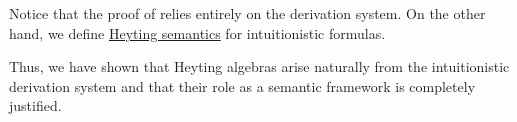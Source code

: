 \begin{remark}\label{rem:thm:intuitionistic_lindenbaum_tarski_algebra/syntactic_proof}
  Notice that the proof of  relies entirely on the derivation system. On the other hand, we define \hyperref[def:propositional_heyting_algebra_semantics]{Heyting semantics} for intuitionistic formulas.

  Thus, we have shown that Heyting algebras arise naturally from the intuitionistic derivation system and that their role as a semantic framework is completely justified.
\end{remark}
